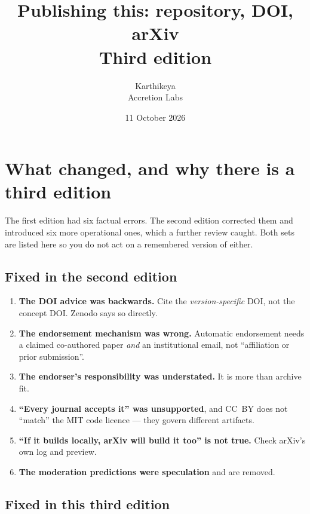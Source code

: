 \documentclass[11pt]{article}
\title{\textbf{Publishing this: repository, DOI, arXiv}\\
\large Third edition}
\author{Karthikeya \\ \small Accretion Labs}
\date{11 October 2026}
\begin{document}
\maketitle

\section*{What changed, and why there is a third edition}

The first edition had six factual errors. The second edition corrected them and introduced
six more operational ones, which a further review caught. Both sets are listed here so you
do not act on a remembered version of either.

\subsection*{Fixed in the second edition}

\begin{enumerate}[nosep]
\item \textbf{The DOI advice was backwards.} Cite the \emph{version-specific} DOI, not the
      concept DOI. Zenodo says so directly.
\item \textbf{The endorsement mechanism was wrong.} Automatic endorsement needs a claimed
      co-authored paper \emph{and} an institutional email, not ``affiliation or prior
      submission''.
\item \textbf{The endorser's responsibility was understated.} It is more than archive fit.
\item \textbf{``Every journal accepts it'' was unsupported}, and CC~BY does not ``match''
      the MIT code licence --- they govern different artifacts.
\item \textbf{``If it builds locally, arXiv will build it too'' is not true.} Check arXiv's
      own log and preview.
\item \textbf{The moderation predictions were speculation} and are removed.
\end{enumerate}

\subsection*{Fixed in this third edition}
\end{document}
